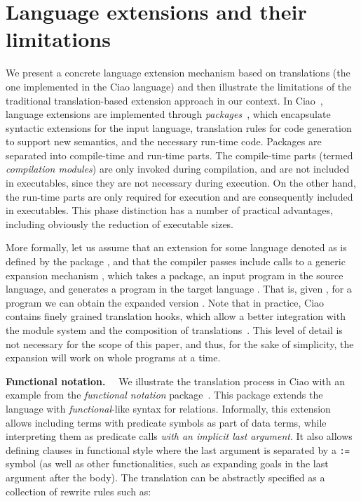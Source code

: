 \documentclass[preprint]{llncs}
\begin{document}
\newcommand\sfun[1]{\llbracket \textit{#1} \rrbracket}
\newcommand\sfunx[2]{\llbracket \textit{#1} \rrbracket #2}

\section{Language extensions and their limitations}
\label{sec:background}

We present a concrete language extension mechanism based on
translations (the one implemented in the Ciao language) and then
illustrate the limitations of the traditional translation-based
extension approach in our context.  In
Ciao~\cite{hermenegildo11:ciao-design-tplp}, language extensions are
implemented through \emph{packages}~\cite{ciao-modules-cl2000}, which
encapsulate syntactic extensions for the input language, translation
rules for code generation to support new semantics, and the necessary
run-time code.  Packages are separated into compile-time and run-time
parts. The compile-time parts (termed \emph{compilation modules}) are
only invoked during compilation, and are not included in executables,
since they are not necessary during execution.
On the other hand, the run-time parts are only required for execution
and are consequently included in executables.
This phase distinction has a number of practical advantages, including
obviously the reduction of executable sizes.

More formally, let us assume that an extension for some language denoted
as  is defined by the package , and that
the compiler passes include calls to a generic expansion mechanism
, which takes a package, an input program in the source
language, and generates a program in the target language
.
That is, given , for a program  we can obtain the expanded version
. Note that in practice,
Ciao contains finely grained translation hooks, which allow a better
integration with the module system and the composition of
translations~\cite{composing-extensions-lopstr-11}. This level of
detail is not necessary for the scope of this paper, and thus, for the
sake of simplicity, the expansion will work on whole programs at a
time.

\newcommand\kw[1]{~\mbox{\tt #1}~}
\newcommand\rr[2]{\mbox{\textsf{\textbf{#1}}}\llbracket~#2~\rrbracket}
\newcommand\rrl[2]{\mbox{\textsf{\textbf{#1}}}\llbracket#2\rrbracket}

\vspace{1.5ex}
\noindent\textbf{Functional notation.}~~ We illustrate the translation
process in Ciao with an example from the \emph{functional notation}
package~\cite{functional-lazy-notation-flops2006}. This package extends
the language with \emph{functional}-like syntax for relations. Informally,
this extension allows including terms with predicate symbols as part of
data terms, while interpreting them as predicate calls \emph{with an
implicit last argument}. It also allows defining clauses in functional
style where the last argument is separated by a
\texttt{:=} symbol (as well as other functionalities, such as expanding
goals in the last argument after the body).  The translation can be
abstractly specified as a collection of rewrite rules such as:
\end{document}
